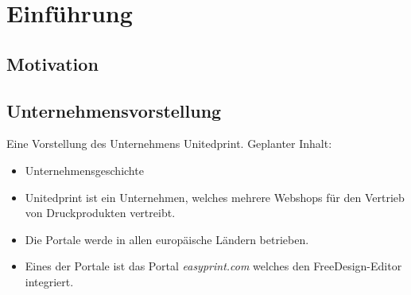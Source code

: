 \chapter{Einführung} 
\section{Motivation}
\section{Unternehmensvorstellung} 
Eine Vorstellung des Unternehmens Unitedprint.
Geplanter Inhalt:
\begin{itemize}
    \item Unternehmensgeschichte
    \item Unitedprint ist ein Unternehmen, welches mehrere Webshops für den Vertrieb von Druckprodukten vertreibt. 
    \item Die Portale werde in allen europäische Ländern betrieben. 
    \item Eines der Portale ist das Portal \emph{easyprint.com} welches den FreeDesign-Editor integriert.
\end{itemize}

% 

